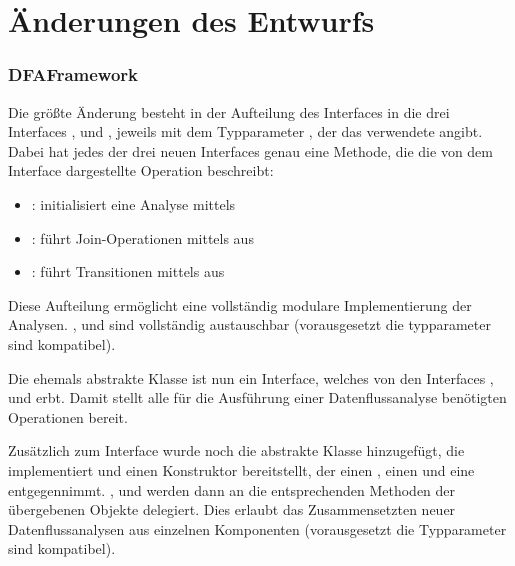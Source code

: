 \part{Änderungen des Entwurfs}

\section{DFAFramework}

Die größte Änderung besteht in der Aufteilung des Interfaces  in die drei Interfaces ,  und , jeweils mit dem Typparameter , der das verwendete  angibt.
Dabei hat jedes der drei neuen Interfaces genau eine Methode, die die von dem Interface dargestellte Operation beschreibt:

\begin{itemize}
	\item {}: initialisiert eine Analyse mittels 
	\item {}: führt Join-Operationen mittels  aus
	\item {}: führt Transitionen mittels  aus
\end{itemize}

Diese Aufteilung ermöglicht eine vollständig modulare Implementierung der Analysen.
,  und  sind vollständig austauschbar (vorausgesetzt die typparameter sind kompatibel).

Die ehemals abstrakte Klasse  ist nun ein Interface, welches von den Interfaces ,  und  erbt.
Damit stellt  alle für die Ausführung einer Datenflussanalyse benötigten Operationen bereit.

Zusätzlich zum Interface  wurde noch die abstrakte Klasse  hinzugefügt, die  implementiert und einen Konstruktor bereitstellt, der einen , einen  und eine  entgegennimmt.
,  und  werden dann an die entsprechenden Methoden der übergebenen Objekte delegiert.
Dies erlaubt das Zusammensetzten neuer Datenflussanalysen aus einzelnen Komponenten (vorausgesetzt die Typparameter sind kompatibel).

